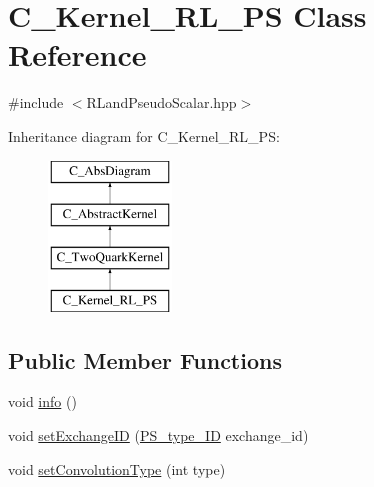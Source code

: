 \hypertarget{class_c___kernel___r_l___p_s}{\section{C\-\_\-\-Kernel\-\_\-\-R\-L\-\_\-\-P\-S Class Reference}
\label{class_c___kernel___r_l___p_s}
}


{\ttfamily \#include $<$R\-Land\-Pseudo\-Scalar.\-hpp$>$}

Inheritance diagram for C\-\_\-\-Kernel\-\_\-\-R\-L\-\_\-\-P\-S\-:\begin{figure}[H]
\begin{center}
\leavevmode
\includegraphics[height=4.000000cm]{class_c___kernel___r_l___p_s}
\end{center}
\end{figure}
\subsection*{Public Member Functions}
\begin{DoxyCompactItemize}
\item 
void \hyperlink{class_c___kernel___r_l___p_s_ab0bfc75c8acd42ade61f354e6203c74d}{info} ()
\item 
void \hyperlink{class_c___kernel___r_l___p_s_a0816423598f9a3a2c0db4b735e24666b}{set\-Exchange\-I\-D} (\hyperlink{_abstract_kernel_8hpp_a7d489d4c6a933f94b90a630d2851e68d}{P\-S\-\_\-type\-\_\-\-I\-D} exchange\-\_\-id)
\item 
void \hyperlink{class_c___kernel___r_l___p_s_a80a925fa85452e40566f03a9ba8e0e06}{set\-Convolution\-Type} (int type)
\end{DoxyCompactItemize}
